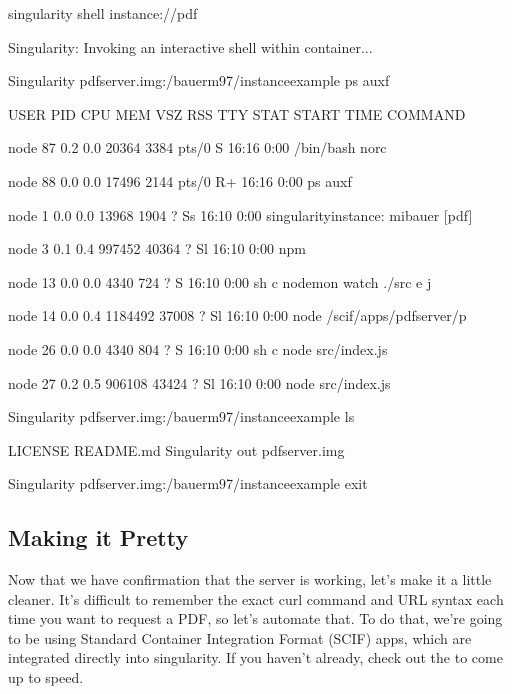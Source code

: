 \documentclass[letterpaper,10pt,english]{sphinxmanual}
\begin{document}
%
\begin{sphinxVerbatim}[commandchars=\\\{\}]
\PYGZdl{} singularity shell instance://pdf

Singularity: Invoking an interactive shell within container...


Singularity pdf\PYGZus{}server.img:\PYGZti{}/bauerm97/instance\PYGZhy{}example\PYGZgt{} ps auxf

USER       PID \PYGZpc{}CPU \PYGZpc{}MEM    VSZ   RSS TTY      STAT START   TIME COMMAND

node        87  0.2  0.0  20364  3384 pts/0    S    16:16   0:00 /bin/bash \PYGZhy{}\PYGZhy{}norc

node        88  0.0  0.0  17496  2144 pts/0    R+   16:16   0:00  \PYGZbs{}\PYGZus{} ps auxf

node         1  0.0  0.0  13968  1904 ?        Ss   16:10   0:00 singularity\PYGZhy{}instance: mibauer [pdf]

node         3  0.1  0.4 997452 40364 ?        Sl   16:10   0:00 npm

node        13  0.0  0.0   4340   724 ?        S    16:10   0:00  \PYGZbs{}\PYGZus{} sh \PYGZhy{}c nodemon \PYGZhy{}\PYGZhy{}watch ./src \PYGZhy{}e j

node        14  0.0  0.4 1184492 37008 ?       Sl   16:10   0:00      \PYGZbs{}\PYGZus{} node /scif/apps/pdf\PYGZus{}server/p

node        26  0.0  0.0   4340   804 ?        S    16:10   0:00          \PYGZbs{}\PYGZus{} sh \PYGZhy{}c node src/index.js

node        27  0.2  0.5 906108 43424 ?        Sl   16:10   0:00              \PYGZbs{}\PYGZus{} node src/index.js

Singularity pdf\PYGZus{}server.img:\PYGZti{}/bauerm97/instance\PYGZhy{}example\PYGZgt{} ls

LICENSE  README.md  Singularity  out  pdf\PYGZus{}server.img

Singularity pdf\PYGZus{}server.img:\PYGZti{}/bauerm97/instance\PYGZhy{}example\PYGZgt{} exit
\end{sphinxVerbatim}


\subsection{Making it Pretty}
\label{\detokenize{running_services:making-it-pretty}}
Now that we have confirmation that the server is working, let’s make
it a little cleaner. It’s difficult to remember the exact curl command
and URL syntax each time you want to request a PDF, so let’s automate
that. To do that, we’re going to be using Standard Container
Integration Format (SCIF) apps, which are integrated directly into
singularity. If you haven’t already, check out the  to come up to
speed.
\end{document}

